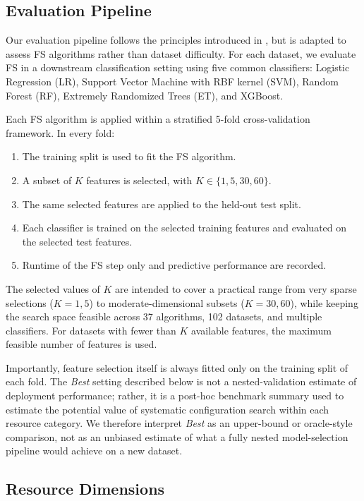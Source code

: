 \documentclass[preprint,12pt,authoryear]{elsarticle}
\begin{document}
{\subsection{Evaluation Pipeline}

Our evaluation pipeline follows the principles introduced in \cite{elmakias2025choosing}, but is adapted to assess FS algorithms rather than dataset difficulty. For each dataset, we evaluate FS in a downstream classification setting using five common classifiers: Logistic Regression (LR), Support Vector Machine with RBF kernel (SVM), Random Forest (RF), Extremely Randomized Trees (ET), and XGBoost.

Each FS algorithm is applied within a stratified 5-fold cross-validation framework. In every fold:
\begin{enumerate}
    \item The training split is used to fit the FS algorithm.
    \item A subset of $K$ features is selected, with $K \in \{1,5,30,60\}$.
    \item The same selected features are applied to the held-out test split.
    \item Each classifier is trained on the selected training features and evaluated on the selected test features.
    \item Runtime of the FS step only and predictive performance are recorded.
\end{enumerate}

The selected values of $K$ are intended to cover a practical range from very sparse selections ($K=1,5$) to moderate-dimensional subsets ($K=30,60$), while keeping the search space feasible across 37 algorithms, 102 datasets, and multiple classifiers. For datasets with fewer than $K$ available features, the maximum feasible number of features is used.

Importantly, feature selection itself is always fitted only on the training split of each fold. The \emph{Best} setting described below is not a nested-validation estimate of deployment performance; rather, it is a post-hoc benchmark summary used to estimate the potential value of systematic configuration search within each resource category. We therefore interpret \emph{Best} as an upper-bound or oracle-style comparison, not as an unbiased estimate of what a fully nested model-selection pipeline would achieve on a new dataset.

\subsection{Resource Dimensions}\label{sec:resource_dimensions}

}
\end{document}
